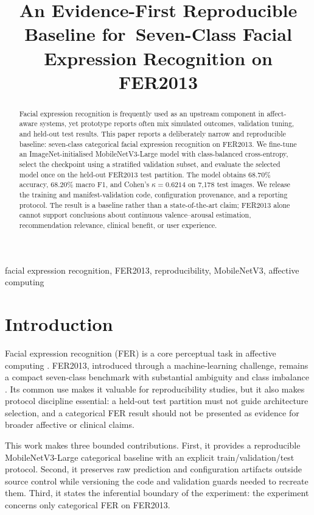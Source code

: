 \documentclass[10pt,conference]{IEEEtran}
\title{An Evidence-First Reproducible Baseline for\
Seven-Class Facial Expression Recognition on FER2013}
\author{\IEEEauthorblockN{Mursalin}
\IEEEauthorblockA{Independent Researcher\\
\texttt{programmer.mursalin016@gmail.com}}}
\begin{document}
\maketitle

\begin{abstract}
Facial expression recognition is frequently used as an upstream component in affect-aware systems, yet prototype reports often mix simulated outcomes, validation tuning, and held-out test results. This paper reports a deliberately narrow and reproducible baseline: seven-class categorical facial expression recognition on FER2013. We fine-tune an ImageNet-initialised MobileNetV3-Large model with class-balanced cross-entropy, select the checkpoint using a stratified validation subset, and evaluate the selected model once on the held-out FER2013 test partition. The model obtains 68.70\% accuracy, 68.20\% macro F1, and Cohen's $\kappa=0.6214$ on 7,178 test images. We release the training and manifest-validation code, configuration provenance, and a reporting protocol. The result is a baseline rather than a state-of-the-art claim; FER2013 alone cannot support conclusions about continuous valence--arousal estimation, recommendation relevance, clinical benefit, or user experience.
\end{abstract}

\begin{IEEEkeywords}
facial expression recognition, FER2013, reproducibility, MobileNetV3, affective computing
\end{IEEEkeywords}

\section{Introduction}
Facial expression recognition (FER) is a core perceptual task in affective computing \cite{picard2000affective}. FER2013, introduced through a machine-learning challenge, remains a compact seven-class benchmark with substantial ambiguity and class imbalance \cite{goodfellow2013challenges}. Its common use makes it valuable for reproducibility studies, but it also makes protocol discipline essential: a held-out test partition must not guide architecture selection, and a categorical FER result should not be presented as evidence for broader affective or clinical claims.

This work makes three bounded contributions. First, it provides a reproducible MobileNetV3-Large categorical baseline with an explicit train/validation/test protocol. Second, it preserves raw prediction and configuration artifacts outside source control while versioning the code and validation guards needed to recreate them. Third, it states the inferential boundary of the experiment: the experiment concerns only categorical FER on FER2013.
\end{document}

